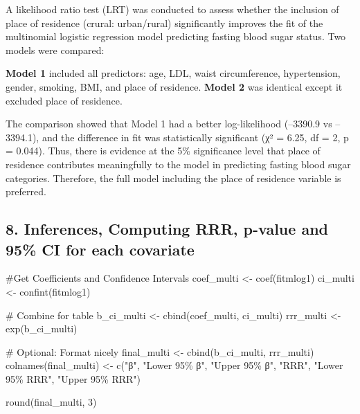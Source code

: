 \documentclass[
  letterpaper,
  DIV=11,
  numbers=noendperiod]{scrartcl}
\newenvironment{Shaded}{\begin{snugshade}}{\end{snugshade}}
\newcommand{\CommentTok}[1]{\textcolor[rgb]{0.37,0.37,0.37}{#1}}
\newcommand{\DecValTok}[1]{\textcolor[rgb]{0.68,0.00,0.00}{#1}}
\newcommand{\FunctionTok}[1]{\textcolor[rgb]{0.28,0.35,0.67}{#1}}
\newcommand{\NormalTok}[1]{\textcolor[rgb]{0.00,0.23,0.31}{#1}}
\newcommand{\OtherTok}[1]{\textcolor[rgb]{0.00,0.23,0.31}{#1}}
\newcommand{\StringTok}[1]{\textcolor[rgb]{0.13,0.47,0.30}{#1}}
\begin{document}
A likelihood ratio test (LRT) was conducted to assess whether the
inclusion of place of residence (crural: urban/rural) significantly
improves the fit of the multinomial logistic regression model predicting
fasting blood sugar status. Two models were compared:

\textbf{Model 1} included all predictors: age, LDL, waist circumference,
hypertension, gender, smoking, BMI, and place of residence.
\textbf{Model 2} was identical except it excluded place of residence.

The comparison showed that Model 1 had a better log-likelihood (--3390.9
vs --3394.1), and the difference in fit was statistically significant
(χ² = 6.25, df = 2, p = 0.044). Thus, there is evidence at the 5\%
significance level that place of residence contributes meaningfully to
the model in predicting fasting blood sugar categories. Therefore, the
full model including the place of residence variable is preferred.

\subsection{8. Inferences, Computing RRR, p-value and 95\% CI for each
covariate}\label{inferences-computing-rrr-p-value-and-95-ci-for-each-covariate}

\begin{Shaded}
\begin{Highlighting}[]
\CommentTok{\#Get Coefficients and Confidence Intervals}
\NormalTok{coef\_multi }\OtherTok{\textless{}{-}} \FunctionTok{coef}\NormalTok{(fitmlog1)}
\NormalTok{ci\_multi }\OtherTok{\textless{}{-}} \FunctionTok{confint}\NormalTok{(fitmlog1)}

\CommentTok{\# Combine for table}
\NormalTok{b\_ci\_multi }\OtherTok{\textless{}{-}} \FunctionTok{cbind}\NormalTok{(coef\_multi, ci\_multi)}
\NormalTok{rrr\_multi }\OtherTok{\textless{}{-}} \FunctionTok{exp}\NormalTok{(b\_ci\_multi)}

\CommentTok{\# Optional: Format nicely}
\NormalTok{final\_multi }\OtherTok{\textless{}{-}} \FunctionTok{cbind}\NormalTok{(b\_ci\_multi, rrr\_multi)}
\FunctionTok{colnames}\NormalTok{(final\_multi) }\OtherTok{\textless{}{-}} \FunctionTok{c}\NormalTok{(}\StringTok{"β"}\NormalTok{, }\StringTok{"Lower 95\% β"}\NormalTok{, }\StringTok{"Upper 95\% β"}\NormalTok{,}
                           \StringTok{"RRR"}\NormalTok{, }\StringTok{"Lower 95\% RRR"}\NormalTok{, }\StringTok{"Upper 95\% RRR"}\NormalTok{)}

\FunctionTok{round}\NormalTok{(final\_multi, }\DecValTok{3}\NormalTok{)}
\end{Highlighting}
\end{Shaded}
\end{document}
